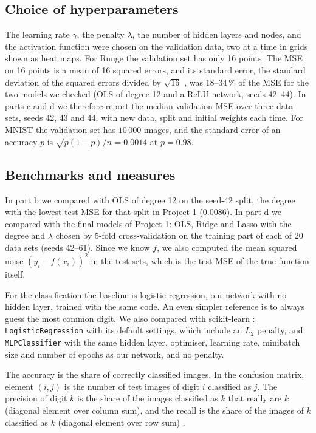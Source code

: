 \subsection*{Choice of hyperparameters}

The learning rate $\gamma$, the penalty $\lambda$, the number of hidden layers and nodes, and the activation function were chosen on the validation data, two at a time in grids shown as heat maps. For Runge the validation set has only 16 points. The MSE on 16 points is a mean of 16 squared errors, and its standard error, the standard deviation of the squared errors divided by $\sqrt{16}$ \cite[Eq.~2.24]{HjorthJensen2026}, was 18--34\,\% of the MSE for the two models we checked (OLS of degree 12 and a ReLU network, seeds 42--44). In parts c and d we therefore report the median validation MSE over three data sets, seeds 42, 43 and 44, with new data, split and initial weights each time. For MNIST the validation set has $10\,000$ images, and the standard error of an accuracy $p$ is $\sqrt{p(1 - p)/n} = 0.0014$ at $p = 0.98$.

\subsection*{Benchmarks and measures}

In part b we compared with OLS of degree 12 on the seed-42 split, the degree with the lowest test MSE for that split in Project 1 (0.0086). In part d we compared with the final models of Project 1: OLS, Ridge and Lasso with the degree and $\lambda$ chosen by 5-fold cross-validation on the training part of each of 20 data sets (seeds 42--61). Since we know $f$, we also computed the mean squared noise $(y_i - f(x_i))^2$ in the test sets, which is the test MSE of the true function itself.

For the classification the baseline is logistic regression, our network with no hidden layer, trained with the same code. An even simpler reference is to always guess the most common digit. We also compared with scikit-learn \cite{Pedregosa2011}: \texttt{LogisticRegression} with its default settings, which include an $L_2$ penalty, and \texttt{MLPClassifier} with the same hidden layer, optimiser, learning rate, minibatch size and number of epochs as our network, and no penalty.

The accuracy is the share of correctly classified images. In the confusion matrix, element $(i, j)$ is the number of test images of digit $i$ classified as $j$. The precision of digit $k$ is the share of the images classified as $k$ that really are $k$ (diagonal element over column sum), and the recall is the share of the images of $k$ classified as $k$ (diagonal element over row sum) \cite[Sec.~5.12]{HjorthJensen2026}.

